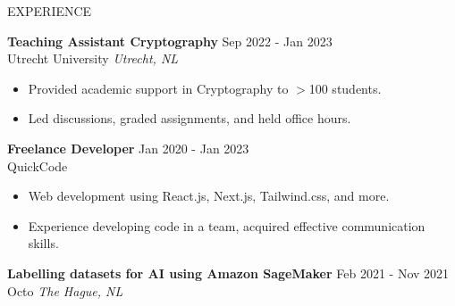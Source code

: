 \documentclass{resume} %
\begin{document}
\begin{rSection}{EXPERIENCE}


\textbf{Teaching Assistant Cryptography} \hfill Sep 2022 - Jan 2023\\
Utrecht University \hfill \textit{Utrecht, NL}
 \begin{itemize}
    \itemsep -3pt {} 
    \item Provided academic support in Cryptography to $>$100 students.
    \item Led discussions, graded assignments, and held office hours.
 \end{itemize}
 
\textbf{Freelance Developer} \hfill Jan 2020 - Jan 2023\\
QuickCode %
 \begin{itemize}
    \itemsep -3pt {} 
     \item Web development using React.js, Next.js, Tailwind.css, and more.
     \item Experience developing code in a team, acquired effective communication skills.
 \end{itemize}

\textbf{Labelling datasets for AI using Amazon SageMaker} \hfill Feb 2021 - Nov 2021\\
Octo \hfill \textit{The Hague, NL}

\end{rSection} 

\end{document}
